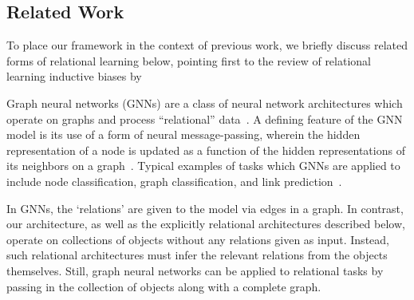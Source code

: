 \subsection{Related Work}\label{ssec:related_work}

To place our framework in the context of previous work, we briefly discuss related forms of relational learning below, pointing first to the review of relational learning inductive biases by~\cite{battagliaRelationalInductiveBiases2018}%

{Graph neural networks} (GNNs) are a class of neural network architectures which operate on graphs and process ``relational'' data~\citep{niepertLearningConvolutionalNeural2016,kipfSemiSupervisedClassificationGraph2017,schlichtkrullModelingRelationalData2017,velickovicGraphAttentionNetworks2017,kipfNeuralRelationalInference2018,xuHowPowerfulAre2018}. A defining feature of the GNN model is its use of a form of neural message-passing, wherein the hidden representation of a node is updated as a function of the hidden representations of its neighbors on a graph~\citep{gilmerNeuralMessagePassing2017}. Typical examples of tasks which GNNs are applied to include node classification, graph classification, and link prediction~\citep{hamiltonGraphRepresentationLearning2020}. %

In GNNs, the `relations' are given to the model via edges in a graph. In contrast, our architecture, as well as the explicitly relational architectures described below, operate on collections of objects without any relations given as input. Instead, such relational architectures must infer the relevant relations from the objects themselves. Still, graph neural networks can be applied to relational tasks by passing in the collection of objects along with a complete graph. %

